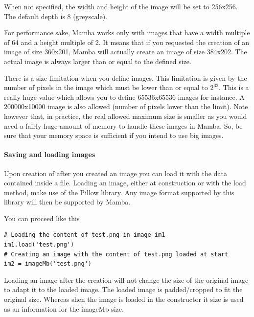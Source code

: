 \documentclass[a4paper,10pt,oneside]{article}
\begin{document}
When not specified, the width and height of the image will be set to 
256x256. The default depth is 8 (greyscale).

For performance sake, Mamba works only with images that have a width multiple of
64 and a height multiple of 2. It means that if you requested the creation of
an image of size 360x201, Mamba will actually create an image of size 384x202. 
The actual image is always larger than or equal to the defined size.

There is a size limitation when you define images. This limitation is given by
the number of pixels in the image which must be lower than or equal to $2^{32}$.
This is a really huge value which allows you to define 65536x65536 images for instance.
A 200000x10000 image is also allowed (number of pixels lower than the limit).
Note however that, in practice, the real allowed maximum size is smaller as you would
need a fairly huge amount of memory to handle these images in Mamba. So, be sure
that your memory space is sufficient if you intend to use big images.


\paragraph{Saving and loading images}

Upon creation of after you created an image you can load it with the data
contained inside a file. Loading an image, either at construction or
with the load method, make use of the Pillow library. Any image format supported
by this library will then be supported by Mamba.

You can proceed like this

\lstset{language=Python}
\begin{lstlisting}
# Loading the content of test.png in image im1
im1.load('test.png')
# Creating an image with the content of test.png loaded at start
im2 = imageMb('test.png')
\end{lstlisting}

Loading an image after the creation will not change the size of the original 
image to adapt it to the loaded image. The loaded image is padded/cropped to fit
the original size. Whereas shen the image is loaded in the constructor it size
is used as an information for the imageMb size.
\end{document}
